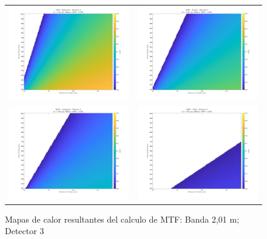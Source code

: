 \begin{landscape}
\begin{figure}[p]
\centering
\setlength{\tabcolsep}{2pt}
\renewcommand{\arraystretch}{0}

\begin{tabular}{cc}
\includegraphics[width=0.48\linewidth]{4.Payload/MTF/MTF_Lambda2_Detector3_Telescopio1_heatmap.jpg} &
\includegraphics[width=0.48\linewidth]{4.Payload/MTF/MTF_Lambda2_Detector3_Telescopio2_heatmap.jpg} \\
\includegraphics[width=0.48\linewidth]{4.Payload/MTF/MTF_Lambda2_Detector3_Telescopio3_heatmap.jpg} &
\includegraphics[width=0.48\linewidth]{4.Payload/MTF/MTF_Lambda2_Detector3_Telescopio4_heatmap.jpg} \\
\end{tabular}
\caption{Mapas de calor resultantes del calculo de MTF: Banda 2,01 \textmu m; Detector 3}
\end{figure}
\end{landscape}





